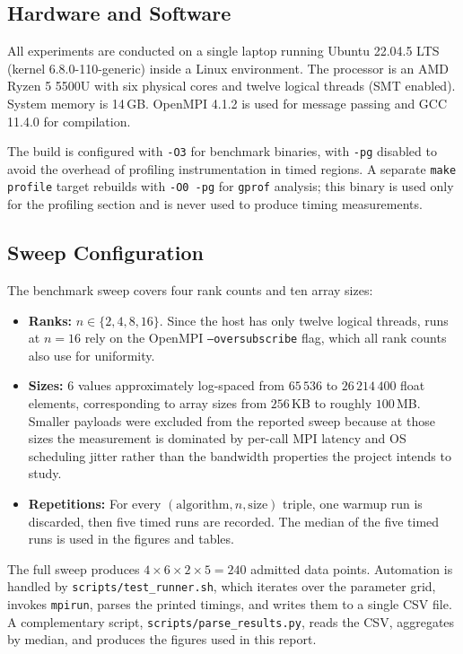 \documentclass[12pt,a4paper]{article}
\begin{document}
\subsection{Hardware and Software}

All experiments are conducted on a single laptop running Ubuntu 22.04.5 LTS (kernel 6.8.0-110-generic) inside a Linux environment. The processor is an AMD Ryzen 5 5500U with six physical cores and twelve logical threads (SMT enabled). System memory is 14\,GB. OpenMPI 4.1.2 is used for message passing and GCC 11.4.0 for compilation.

The build is configured with \texttt{-O3} for benchmark binaries, with \texttt{-pg} disabled to avoid the overhead of profiling instrumentation in timed regions. A separate \texttt{make profile} target rebuilds with \texttt{-O0 -pg} for \texttt{gprof} analysis; this binary is used only for the profiling section and is never used to produce timing measurements.

\subsection{Sweep Configuration}

The benchmark sweep covers four rank counts and ten array sizes:

\begin{itemize}
    \item \textbf{Ranks:} $n \in \{2, 4, 8, 16\}$. Since the host has only twelve logical threads, runs at $n=16$ rely on the OpenMPI \texttt{--oversubscribe} flag, which all rank counts also use for uniformity.
    \item \textbf{Sizes:} $6$ values approximately log-spaced from $65\,536$ to $26\,214\,400$ float elements, corresponding to array sizes from $256$\,KB to roughly $100$\,MB. Smaller payloads were excluded from the reported sweep because at those sizes the measurement is dominated by per-call MPI latency and OS scheduling jitter rather than the bandwidth properties the project intends to study.
    \item \textbf{Repetitions:} For every $(\text{algorithm}, n, \text{size})$ triple, one warmup run is discarded, then five timed runs are recorded. The median of the five timed runs is used in the figures and tables.
\end{itemize}

The full sweep produces $4 \times 6 \times 2 \times 5 = 240$ admitted data points. Automation is handled by \texttt{scripts/test\_runner.sh}, which iterates over the parameter grid, invokes \texttt{mpirun}, parses the printed timings, and writes them to a single CSV file. A complementary script, \texttt{scripts/parse\_results.py}, reads the CSV, aggregates by median, and produces the figures used in this report.
\end{document}

